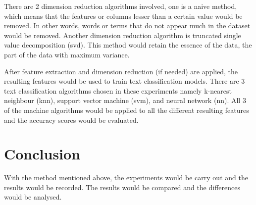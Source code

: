 There are 2 dimension reduction algorithms involved, one is a naive method, which means that the features or columns lesser than a certain value would be removed. In other words, words or terms that do not appear much in the dataset would be removed. Another dimension reduction algorithm is truncated single value decomposition (\ac{svd}). This method would retain the essence of the data, the part of the data with maximum variance. 

After feature extraction and dimension reduction (if needed) are applied, the resulting features would be used to train text classification models. There are 3 text classification algorithms chosen in these experiments namely k-nearest neighbour (\ac{knn}), support vector machine (\ac{svm}), and neural network (\ac{nn}). All 3 of the machine algorithms would be applied to all the different resulting features and the accuracy scores would be evaluated.


\section{Conclusion}
With the method mentioned above, the experiments would be carry out and the results would be recorded. The results would be compared and the differences would be analysed.